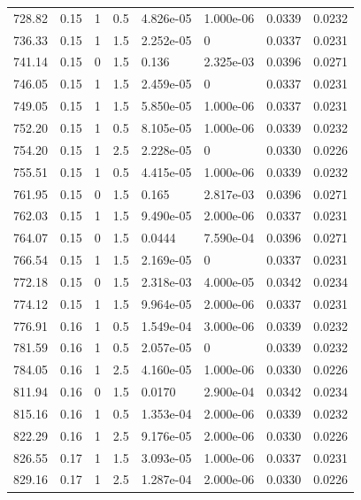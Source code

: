 \documentclass[preview]{standalone}
\begin{document}
{{{\begin{tabular}{L{1.2cm}C{1.2cm} C{0.3cm}C{0.5cm} C{1.4cm}C{1.4cm} C{1.4cm}C{1.4cm}}
  728.82  &  0.15  & 1     & 0.5 &  4.826e-05  & 1.000e-06  & 0.0339 &  0.0232   \\ 
  736.33  &  0.15  & 1     & 1.5 &  2.252e-05  & 0  & 0.0337 &  0.0231   \\ 
  741.14  &  0.15  & 0     & 1.5 &  0.136  & 2.325e-03  & 0.0396 &  0.0271   \\ 
  746.05  &  0.15  & 1     & 1.5 &  2.459e-05  & 0  & 0.0337 &  0.0231   \\ 
  749.05  &  0.15  & 1     & 1.5 &  5.850e-05  & 1.000e-06  & 0.0337 &  0.0231   \\ 
  752.20  &  0.15  & 1     & 0.5 &  8.105e-05  & 1.000e-06  & 0.0339 &  0.0232   \\ 
  754.20  &  0.15  & 1     & 2.5 &  2.228e-05  & 0  & 0.0330 &  0.0226   \\ 
  755.51  &  0.15  & 1     & 0.5 &  4.415e-05  & 1.000e-06  & 0.0339 &  0.0232   \\ 
  761.95  &  0.15  & 0     & 1.5 &  0.165  & 2.817e-03  & 0.0396 &  0.0271   \\ 
  762.03  &  0.15  & 1     & 1.5 &  9.490e-05  & 2.000e-06  & 0.0337 &  0.0231   \\ 
  764.07  &  0.15  & 0     & 1.5 &  0.0444  & 7.590e-04  & 0.0396 &  0.0271   \\ 
  766.54  &  0.15  & 1     & 1.5 &  2.169e-05  & 0  & 0.0337 &  0.0231   \\ 
  772.18  &  0.15  & 0     & 1.5 &  2.318e-03  & 4.000e-05  & 0.0342 &  0.0234   \\ 
  774.12  &  0.15  & 1     & 1.5 &  9.964e-05  & 2.000e-06  & 0.0337 &  0.0231   \\ 
  776.91  &  0.16  & 1     & 0.5 &  1.549e-04  & 3.000e-06  & 0.0339 &  0.0232   \\ 
  781.59  &  0.16  & 1     & 0.5 &  2.057e-05  & 0  & 0.0339 &  0.0232   \\ 
  784.05  &  0.16  & 1     & 2.5 &  4.160e-05  & 1.000e-06  & 0.0330 &  0.0226   \\ 
  811.94  &  0.16  & 0     & 1.5 &  0.0170  & 2.900e-04  & 0.0342 &  0.0234   \\ 
  815.16  &  0.16  & 1     & 0.5 &  1.353e-04  & 2.000e-06  & 0.0339 &  0.0232   \\ 
  822.29  &  0.16  & 1     & 2.5 &  9.176e-05  & 2.000e-06  & 0.0330 &  0.0226   \\ 
  826.55  &  0.17  & 1     & 1.5 &  3.093e-05  & 1.000e-06  & 0.0337 &  0.0231   \\ 
  829.16  &  0.17  & 1     & 2.5 &  1.287e-04  & 2.000e-06  & 0.0330 &  0.0226   \\ 

\end{tabular}}}}
\end{document}
